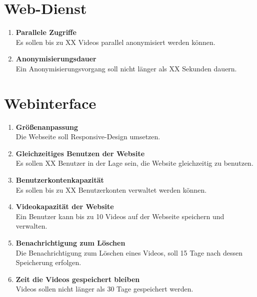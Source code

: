 \section{Web-Dienst}
\begin{enumerate}
\renewcommand{\labelenumi}{\textbf{\theenumi}}
\renewcommand{\theenumi}{NA\arabic{enumi}0}
\setcounter{enumi}{199}

\item \label{na:paralleleZugriffe}\textbf{Parallele Zugriffe} \hfill\\  Es sollen bis zu XX Videos parallel anonymisiert werden können.

\item \textbf{Anonymisierungsdauer} \hfill\\  Ein Anonymisierungsvorgang soll nicht länger als XX Sekunden dauern.
\end{enumerate}

\section{Webinterface}
\begin{enumerate}
\renewcommand{\labelenumi}{\textbf{\theenumi}}
\renewcommand{\theenumi}{NA\arabic{enumi}0}
\setcounter{enumi}{299}

\item \textbf{Größenanpassung} \hfill\\  Die Webseite soll Responsive-Design umsetzen.

\item \textbf{Gleichzeitiges Benutzen der Website} \hfill\\  Es sollen XX Benutzer in der Lage sein, die Website gleichzeitig zu benutzen.

\item \textbf{Benutzerkontenkapazität} \hfill\\  Es sollen bis zu XX Benutzerkonten verwaltet werden können.

\item \label{na:VideoKap}\textbf{Videokapazität der Website} \hfill\\  Ein Benutzer kann bis zu 10 Videos auf der Webseite speichern und verwalten.

\item \textbf{Benachrichtigung zum Löschen} \hfill\\  Die Benachrichtigung zum Löschen eines Videos, soll 15 Tage nach dessen Speicherung erfolgen.

\item \textbf{Zeit die Videos gespeichert bleiben} \hfill\\  Videos sollen nicht länger als 30 Tage gespeichert werden.
\end{enumerate}






